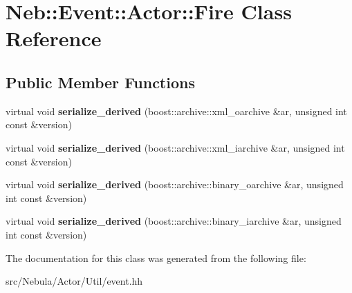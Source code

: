 \hypertarget{classNeb_1_1Event_1_1Actor_1_1Fire}{\section{Neb\-:\-:Event\-:\-:Actor\-:\-:Fire Class Reference}
\label{classNeb_1_1Event_1_1Actor_1_1Fire}
}
\subsection*{Public Member Functions}
\begin{DoxyCompactItemize}
\item 
\hypertarget{classNeb_1_1Event_1_1Actor_1_1Fire_aeeab712a8bc132bc4b119e05d47ba87d}{virtual void {\bfseries serialize\-\_\-derived} (boost\-::archive\-::xml\-\_\-oarchive \&ar, unsigned int const \&version)}\label{classNeb_1_1Event_1_1Actor_1_1Fire_aeeab712a8bc132bc4b119e05d47ba87d}

\item 
\hypertarget{classNeb_1_1Event_1_1Actor_1_1Fire_a2d0e2250cf3976238e8c4d623f0eea29}{virtual void {\bfseries serialize\-\_\-derived} (boost\-::archive\-::xml\-\_\-iarchive \&ar, unsigned int const \&version)}\label{classNeb_1_1Event_1_1Actor_1_1Fire_a2d0e2250cf3976238e8c4d623f0eea29}

\item 
\hypertarget{classNeb_1_1Event_1_1Actor_1_1Fire_aa09cae683af824389171eec336a054f7}{virtual void {\bfseries serialize\-\_\-derived} (boost\-::archive\-::binary\-\_\-oarchive \&ar, unsigned int const \&version)}\label{classNeb_1_1Event_1_1Actor_1_1Fire_aa09cae683af824389171eec336a054f7}

\item 
\hypertarget{classNeb_1_1Event_1_1Actor_1_1Fire_a026adc92ad9162573f5b0f87b4ac93bb}{virtual void {\bfseries serialize\-\_\-derived} (boost\-::archive\-::binary\-\_\-iarchive \&ar, unsigned int const \&version)}\label{classNeb_1_1Event_1_1Actor_1_1Fire_a026adc92ad9162573f5b0f87b4ac93bb}

\end{DoxyCompactItemize}


The documentation for this class was generated from the following file\-:\begin{DoxyCompactItemize}
\item 
src/\-Nebula/\-Actor/\-Util/event.\-hh\end{DoxyCompactItemize}
